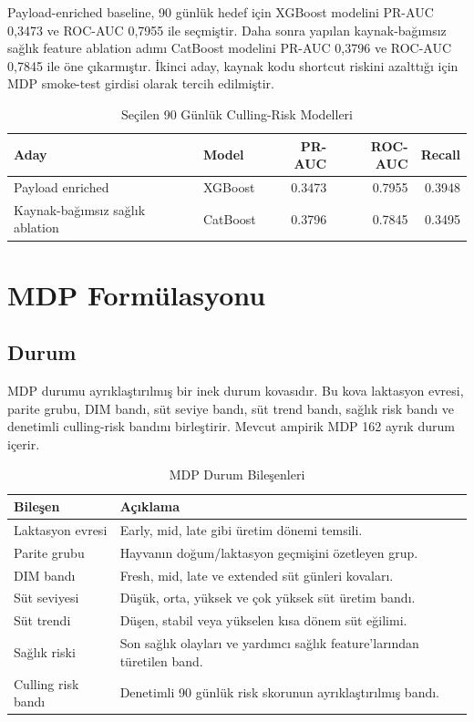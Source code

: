 \documentclass[conference]{IEEEtran}
\begin{document}
Payload-enriched baseline, 90 günlük hedef için XGBoost modelini PR-AUC 0,3473
ve ROC-AUC 0,7955 ile seçmiştir. Daha sonra yapılan kaynak-bağımsız sağlık
feature ablation adımı CatBoost modelini PR-AUC 0,3796 ve ROC-AUC 0,7845 ile
öne çıkarmıştır. İkinci aday, kaynak kodu shortcut riskini azalttığı için MDP
smoke-test girdisi olarak tercih edilmiştir.

\begin{table}[!t]
\caption{Seçilen 90 Günlük Culling-Risk Modelleri}
\label{tab:risk_models}
\centering
\footnotesize
\setlength{\tabcolsep}{3pt}
\begin{tabular}{p{}p{}rrr}
\toprule
Aday & Model & PR-AUC & ROC-AUC & Recall \\
\midrule
Payload enriched & XGBoost & 0.3473 & 0.7955 & 0.3948 \\
Kaynak-bağımsız sağlık ablation & CatBoost & 0.3796 & 0.7845 & 0.3495 \\
\bottomrule
\end{tabular}
\end{table}

\section{MDP Formülasyonu}
\subsection{Durum}
MDP durumu ayrıklaştırılmış bir inek durum kovasıdır. Bu kova laktasyon evresi,
parite grubu, DIM bandı, süt seviye bandı, süt trend bandı, sağlık risk bandı
ve denetimli culling-risk bandını birleştirir. Mevcut ampirik MDP 162 ayrık
durum içerir.

\begin{table}[!t]
\caption{MDP Durum Bileşenleri}
\label{tab:state_components}
\centering
\begin{tabular}{p{}p{}}
\toprule
Bileşen & Açıklama \\
\midrule
Laktasyon evresi & Early, mid, late gibi üretim dönemi temsili. \\
Parite grubu & Hayvanın doğum/laktasyon geçmişini özetleyen grup. \\
DIM bandı & Fresh, mid, late ve extended süt günleri kovaları. \\
Süt seviyesi & Düşük, orta, yüksek ve çok yüksek süt üretim bandı. \\
Süt trendi & Düşen, stabil veya yükselen kısa dönem süt eğilimi. \\
Sağlık riski & Son sağlık olayları ve yardımcı sağlık feature'larından türetilen band. \\
Culling risk bandı & Denetimli 90 günlük risk skorunun ayrıklaştırılmış bandı. \\
\bottomrule
\end{tabular}
\end{table}
\end{document}
